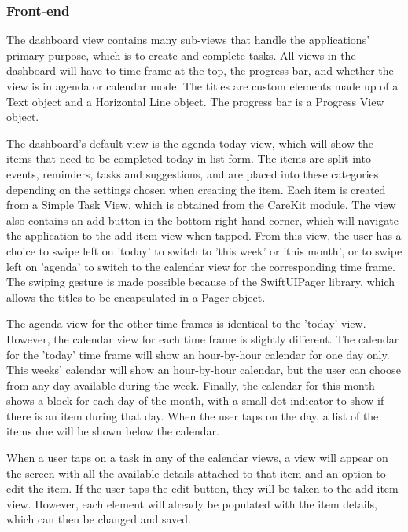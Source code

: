         \subsubsection{Front-end}
        The dashboard view contains many sub-views that handle the applications' primary purpose, which is to create and complete tasks.  All views in the dashboard will have to time frame at the top, the progress bar, and whether the view is in agenda or calendar mode.  The titles are custom elements made up of a Text object and a Horizontal Line object.  The progress bar is a Progress View object.
    
        The dashboard's default view is the agenda today view, which will show the items that need to be completed today in list form.  The items are split into events, reminders, tasks and suggestions, and are placed into these categories depending on the settings chosen when creating the item.  Each item is created from a Simple Task View, which is obtained from the CareKit module.  The view also contains an add button in the bottom right-hand corner, which will navigate the application to the add item view when tapped.  From this view, the user has a choice to swipe left on 'today' to switch to 'this week' or 'this month', or to swipe left on 'agenda' to switch to the calendar view for the corresponding time frame.  The swiping gesture is made possible because of the SwiftUIPager library, which allows the titles to be encapsulated in a Pager object.
        
        
        
        The agenda view for the other time frames is identical to the 'today' view. However, the calendar view for each time frame is slightly different.  The calendar for the 'today' time frame will show an hour-by-hour calendar for one day only.  This weeks' calendar will show an hour-by-hour calendar, but the user can choose from any day available during the week.  Finally, the calendar for this month shows a block for each day of the month, with a small dot indicator to show if there is an item during that day.  When the user taps on the day, a list of the items due will be shown below the calendar.
        
        When a user taps on a task in any of the calendar views, a view will appear on the screen with all the available details attached to that item and an option to edit the item.  If the user taps the edit button, they will be taken to the add item view. However, each element will already be populated with the item details, which can then be changed and saved.
        
